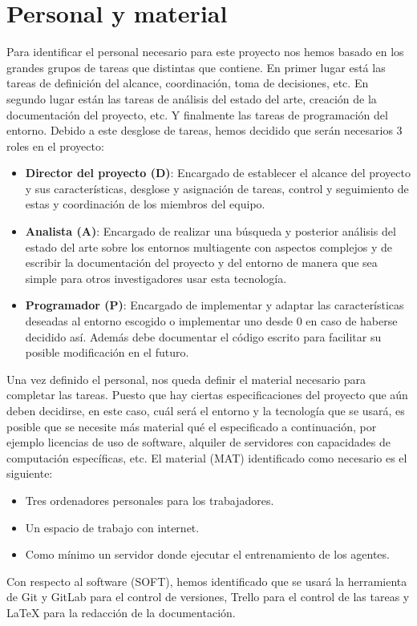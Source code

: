 \section{Personal y material}
Para identificar el personal necesario para este proyecto nos hemos basado en los grandes grupos de tareas que distintas que contiene. En primer lugar está las tareas de definición del alcance, coordinación, toma de decisiones, etc. En segundo lugar están las tareas de análisis del estado del arte, creación de la documentación del proyecto, etc. Y finalmente las tareas de programación del entorno. Debido a este desglose de tareas, hemos decidido que serán necesarios 3 roles en el proyecto:
\begin{itemize}
    \item \textbf{Director del proyecto (D)}: Encargado de establecer el alcance del proyecto y sus características, desglose y asignación de tareas, control y seguimiento de estas y coordinación de los miembros del equipo.
    \item \textbf{Analista (A)}: Encargado de realizar una búsqueda y posterior análisis del estado del arte sobre los entornos multiagente con aspectos complejos y de escribir la documentación del proyecto y del entorno de manera que sea simple para otros investigadores usar esta tecnología.
    \item \textbf{Programador (P)}: Encargado de implementar y adaptar las características deseadas al entorno escogido o implementar uno desde 0 en caso de haberse decidido así. Además debe documentar el código escrito para facilitar su posible modificación en el futuro.  
\end{itemize}
 
 Una vez definido el personal, nos queda definir el material necesario para completar las tareas. Puesto que hay ciertas especificaciones del proyecto que aún deben decidirse, en este caso, cuál será el entorno y la tecnología que se usará, es posible que se necesite más material qué el especificado a continuación, por ejemplo licencias de uso de software, alquiler de servidores con capacidades de computación específicas, etc.
 El material (MAT) identificado como necesario es el siguiente:
 \begin{itemize}
     \item Tres ordenadores personales para los trabajadores.
     \item Un espacio de trabajo con internet.
     \item Como mínimo un servidor donde ejecutar el entrenamiento de los agentes.
 \end{itemize}
 
 Con respecto al software (SOFT), hemos identificado que se usará la herramienta de Git y GitLab para el control de versiones, Trello para el control de las tareas y LaTeX para la redacción de la documentación.